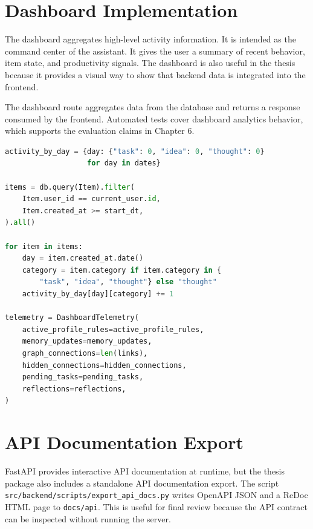 
\section{Dashboard Implementation}

The dashboard aggregates high-level activity information. It is intended as the command center of the assistant. It gives the user a summary of recent behavior, item state, and productivity signals. The dashboard is also useful in the thesis because it provides a visual way to show that backend data is integrated into the frontend.

The dashboard route aggregates data from the database and returns a response consumed by the frontend. Automated tests cover dashboard analytics behavior, which supports the evaluation claims in Chapter 6.

\begin{lstlisting}[language=Python,caption={Dashboard activity and telemetry aggregation},label={lst:dashboard-analytics}]
activity_by_day = {day: {"task": 0, "idea": 0, "thought": 0}
                   for day in dates}

items = db.query(Item).filter(
    Item.user_id == current_user.id,
    Item.created_at >= start_dt,
).all()

for item in items:
    day = item.created_at.date()
    category = item.category if item.category in {
        "task", "idea", "thought"} else "thought"
    activity_by_day[day][category] += 1

telemetry = DashboardTelemetry(
    active_profile_rules=active_profile_rules,
    memory_updates=memory_updates,
    graph_connections=len(links),
    hidden_connections=hidden_connections,
    pending_tasks=pending_tasks,
    reflections=reflections,
)
\end{lstlisting}

\section{API Documentation Export}

FastAPI provides interactive API documentation at runtime, but the thesis package also includes a standalone API documentation export. The script \texttt{src/backend/scripts/export\_api\_docs.py} writes OpenAPI JSON and a ReDoc HTML page to \texttt{docs/api}. This is useful for final review because the API contract can be inspected without running the server.

